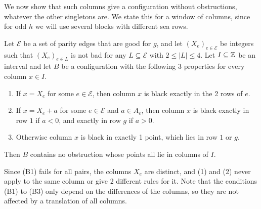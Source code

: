 We now show that such columns give a configuration without obstructions, whatever the
other singletons are. We state this for a window of columns, since for odd $h$ we will use
several blocks with different sea rows.

\begin{lemma}\label{lem:block}
Let $\mathcal E$ be a set of parity edges that are good for $g$, and let
$(X_e)_{e\in\mathcal E}$ be integers such that $(X_e)_{e\in L}$ is not bad for any
$L\subseteq\mathcal E$ with $2\le|L|\le4$. Let
$I\subseteq\mathbb{Z}$ be an interval and let $B$ be a configuration with the following 3
properties for every column $x\in I$.
\begin{enumerate}[(1)]
\item If $x=X_e$ for some $e\in\mathcal E$, then column $x$ is black exactly in the 2 rows
of $e$.
\item If $x=X_e+a$ for some $e\in\mathcal E$ and $a\in A_e$, then column $x$ is black
exactly in row $1$ if $a<0$, and exactly in row $g$ if $a>0$.
\item Otherwise column $x$ is black in exactly 1 point, which lies in row $1$ or $g$.
\end{enumerate}
Then $B$ contains no obstruction whose points all lie in columns of $I$.
\end{lemma}

Since (B1) fails for all pairs, the columns $X_e$ are distinct, and (1) and (2) never apply
to the same column or give 2 different rules for it. Note that the conditions (B1) to (B3) only depend on the differences of the columns, so
they are not affected by a translation of all columns.

